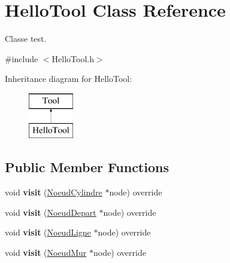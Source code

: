 \hypertarget{class_hello_tool}{}\section{Hello\+Tool Class Reference}
\label{class_hello_tool}


Classe test.  




{\ttfamily \#include $<$Hello\+Tool.\+h$>$}

Inheritance diagram for Hello\+Tool\+:\begin{figure}[H]
\begin{center}
\leavevmode
\includegraphics[height=2.000000cm]{class_hello_tool}
\end{center}
\end{figure}
\subsection*{Public Member Functions}
\begin{DoxyCompactItemize}
\item 
\hypertarget{class_hello_tool_a424b0bdaa28ba6bd7ef52d81f243b86f}{}void {\bfseries visit} (\hyperlink{class_noeud_cylindre}{Noeud\+Cylindre} $\ast$node) override\label{class_hello_tool_a424b0bdaa28ba6bd7ef52d81f243b86f}

\item 
\hypertarget{class_hello_tool_a0aa69d14dab066f514917098e4360c54}{}void {\bfseries visit} (\hyperlink{class_noeud_depart}{Noeud\+Depart} $\ast$node) override\label{class_hello_tool_a0aa69d14dab066f514917098e4360c54}

\item 
\hypertarget{class_hello_tool_a039104bec6599be916caaed48bcadee3}{}void {\bfseries visit} (\hyperlink{class_noeud_ligne}{Noeud\+Ligne} $\ast$node) override\label{class_hello_tool_a039104bec6599be916caaed48bcadee3}

\item 
\hypertarget{class_hello_tool_acb853bcedc7a6006c34ef50cdb5ea1cd}{}void {\bfseries visit} (\hyperlink{class_noeud_mur}{Noeud\+Mur} $\ast$node) override\label{class_hello_tool_acb853bcedc7a6006c34ef50cdb5ea1cd}

\end{DoxyCompactItemize}
